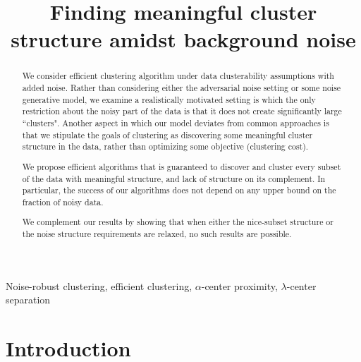 \documentclass[anon,12pt]{colt2016} %
\title[Sparse Noise]{Finding meaningful cluster structure amidst background noise}
\begin{document}
\maketitle

\begin{abstract}

We consider efficient clustering algorithm under data clusterability assumptions with added noise. Rather than considering either the adversarial noise setting
or some noise generative model, we examine a realistically motivated setting is which the only restriction about the noisy part of the data is that it does not
create significantly large ``clusters". Another aspect in which our model deviates from common approaches is that we stipulate the goals of clustering as discovering some meaningful cluster structure in the data, rather than optimizing some objective (clustering cost).

We propose efficient algorithms that is guaranteed to discover and cluster every subset of the data with meaningful structure, and lack of structure on its complement.
In particular, the success of our algorithms does not depend on any upper bound on the fraction of noisy data.

We complement our results by showing that when either the nice-subset structure or the noise structure requirements are relaxed, no such results are possible.

\end{abstract}

\begin{keywords}
Noise-robust clustering, efficient clustering, $\alpha$-center proximity, $\lambda$-center separation
\end{keywords}



\section{Introduction}
\label{sec:intro}
\end{document}
